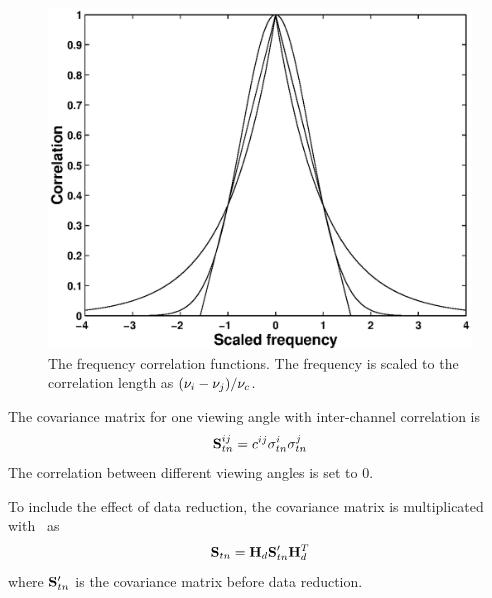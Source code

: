  \begin{figure}
  \begin{center}
   \begin{minipage}[c]{0.65\textwidth}
    \centering
    \includegraphics*[width=0.99\hsize]{Figs/fig_corrfuns.eps}
   \end{minipage}%
   \hspace{0.03\textwidth}%
   \begin{minipage}[c]{0.30\textwidth}
    \centering
    \caption{The frequency correlation functions. The frequency is scaled to
             the correlation length as $(\nu_i-\nu_j)/\nu_c$.}
    \label{fig:measerr:cfuns}
   \end{minipage}
  \end{center}
 \end{figure}           
 
 The covariance matrix for one viewing angle with inter-channel
 correlation is
 \begin{equation}
   \mathbf{S}_{tn}^{ij} = c^{ij} \sigma_{tn}^i \sigma_{tn}^j
  \label{eq:measerr:Stn}
 \end{equation}
 The correlation between different viewing angles is set to 0.

 To include the effect of data reduction, the covariance matrix is
 multiplicated with \Hd\ as
 \begin{equation}
   \mathbf{S}_{tn} = \mathbf{H}_d \mathbf{S}_{tn}' \mathbf{H}_d^T 
   \label{eq:measerr:HSH}
 \end{equation}
 where $\mathbf{S}_{tn}'$ is the covariance matrix before data reduction.


